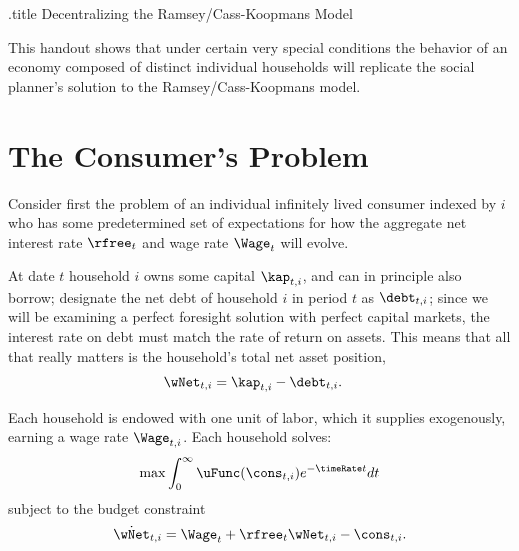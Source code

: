 \documentclass{handout}
\begin{document}
\handoutHeader

\begin{verbatimwrite}{\jobname.title}
Decentralizing the Ramsey/Cass-Koopmans Model
\end{verbatimwrite}

\handoutNameMake




This handout shows that under certain very special conditions the
behavior of an economy composed of distinct individual households will
replicate the social planner's solution to the Ramsey/Cass-Koopmans
model.

\section{The Consumer's Problem}

Consider first the problem of an individual infinitely lived consumer
indexed by $i$ who has some predetermined set of expectations for 
how the aggregate net interest rate $\rfree_{t}$ and wage rate $\Wage_{t}$ will
evolve.

At date $t$ household $i$ owns some capital $\kap_{t,i}$, and can in principle also
borrow; designate the net debt of household $i$ in period $t$ as
$\debt_{t,i}$; since we will be examining a perfect foresight solution with
perfect capital markets, the interest rate on debt must match the 
rate of return on assets.  This means that all that really matters is
the household's total net asset position,
\begin{equation}\begin{gathered}\begin{aligned}
        \wNet_{t,i} & =  \kap_{t,i} - \debt_{t,i}.
\end{aligned}\end{gathered}\end{equation}

Each household is endowed with one unit of labor, which it 
supplies exogenously, earning a wage rate $\Wage_{t,i}$.   
Each household solves:
\begin{equation}
        \max \int_{0}^{\infty} \uFunc(\cons_{t,i}) e^{-\timeRate t} dt
\end{equation}
subject to the budget constraint
\begin{equation}
        \dot{\wNet}_{t,i} = \Wage_{t} + \rfree_{t} \wNet_{t,i} - \cons_{t,i}
.
\end{equation}
\end{document}
